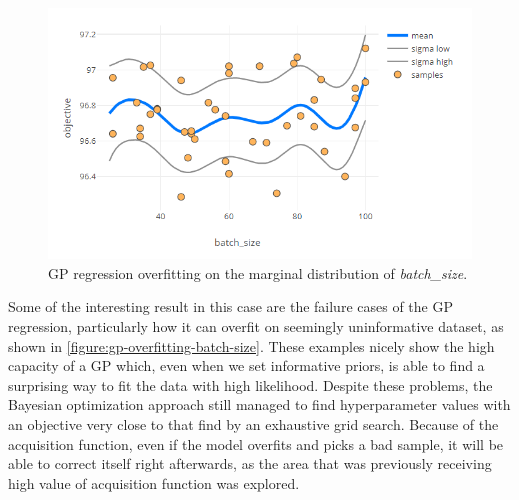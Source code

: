 \begin{figure}
	\begin{center}
		\includegraphics[width=1.0\textwidth]{images/gp-overfitting-batch-size.png}
		\caption{GP regression overfitting on the marginal distribution of \emph{batch\_size}.}
		\label{figure:gp-overfitting-batch-size}
	\end{center}
\end{figure}

Some of the interesting result in this case are the failure cases of the GP regression, particularly how it can overfit on seemingly uninformative dataset, as shown in \autoref{figure:gp-overfitting-batch-size}. These examples nicely show the high capacity of a GP which, even when we set informative priors, is able to find a surprising way to fit the data with high likelihood. Despite these problems, the Bayesian optimization approach still managed to find hyperparameter values with an objective very close to that find by an exhaustive grid search. Because of the acquisition function, even if the model overfits and picks a bad sample, it will be able to correct itself right afterwards, as the area that was previously receiving high value of acquisition function was explored.

